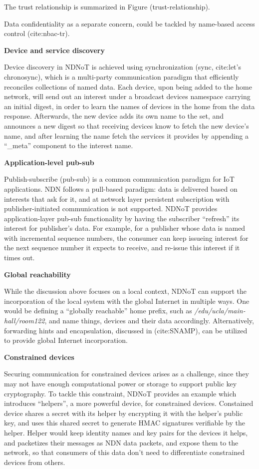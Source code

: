 \documentclass{sig-alternate-05-2015}
\begin{document}
The trust relationship is summarized in Figure (trust-relationship).

Data confidentiality as a separate concern, could be tackled by name-based access control (cite:nbac-tr). 

\textbf{Device and service discovery}

Device discovery in NDNoT is achieved using synchronization (sync, cite:let's chronosync), which is a multi-party communication paradigm that
efficiently reconciles collections of named data. Each device, upon being added to the home network, will send out an interest under a broadcast devices namespace carrying an initial digest, in order to learn the names of devices in the home from the data response. Afterwards, the new device adds its own name to the set, and announces a new digest so that receiving devices know to fetch the new device's name, and after learning the name fetch the services it provides by appending a ``\_meta'' component to the interest name.

\textbf{Application-level pub-sub}

Publish-subscribe (pub-sub) is a common communication paradigm for IoT applications. NDN follows a pull-based paradigm: data is delivered based on interests that ask for it, and at network layer persistent subscription with publisher-initiated communication is not supported. NDNoT provides application-layer pub-sub functionality by having the subscriber ``refresh'' its interest for publisher's data. For example, for a publisher whose data is named with incremental sequence numbers, the consumer can keep issueing interest for the next sequence number it expects to receive, and re-issue this interest if it times out.

\textbf{Global reachability}

While the discussion above focuses on a local context, NDNoT can support the incorporation of the local system with the global Internet in multiple ways. One would be defining a ``globally reachable'' home prefix, such as \textit{/edu/ucla/main-hall/room122}, and name things, devices and their data accordingly. Alternatively, forwarding hints and encapsulation, discussed in (cite:SNAMP), can be utilized to provide global Internet incorporation.

\textbf{Constrained devices}

Securing communication for constrained devices arises as a challenge, since they may not have enough computational power or storage to support public key cryptography. To tackle this constraint, NDNoT provides an example which introduces ``helpers'', a more powerful device, for constrained devices. Constained device shares a secret with its helper by encrypting it with the helper's public key, and uses this shared secret to generate HMAC signatures verifiable by the helper. Helper would keep identity names and key pairs for the devices it helps, and packetizes their messages as NDN data packets, and expose them to the network, so that consumers of this data don't need to differentiate constrained devices from others.
\end{document}
